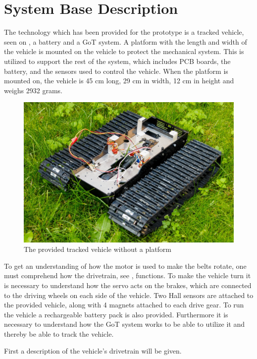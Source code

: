 \section{System Base Description}
\label{sec:Vehicledescription}
The technology which has been provided for the prototype is a tracked vehicle, seen on , a battery and a GoT system. A platform with the length and width of the vehicle is mounted on the vehicle to protect the mechanical system. This is utilized to support the rest of the system, which includes PCB boards, the battery, and the sensors used to control the vehicle. When the platform is mounted on, the vehicle is 45 cm long, 29 cm in width, 12 cm in height and weighs 2932 grams.
%
\begin{figure}[H]
	\centering
	\includegraphics[scale=0.6]{figures/BeltVehicle.jpg}
	\caption{The provided tracked vehicle without a platform}
	\label{TrackedVehicle}
\end{figure}\vspace{-5mm}
%
To get an understanding of how the motor is used to make the belts rotate, one must comprehend how the drivetrain, see , functions. To make the vehicle turn it is necessary to understand how the servo acts on the brakes, which are connected to the driving wheels on each side of the vehicle. Two Hall sensors are attached to the provided vehicle, along with 4 magnets attached to each drive gear. To run the vehicle a rechargeable battery pack is also provided. Furthermore it is necessary to understand how the GoT system works to be able to utilize it and thereby be able to track the vehicle.

First a description of the vehicle's drivetrain will be given.